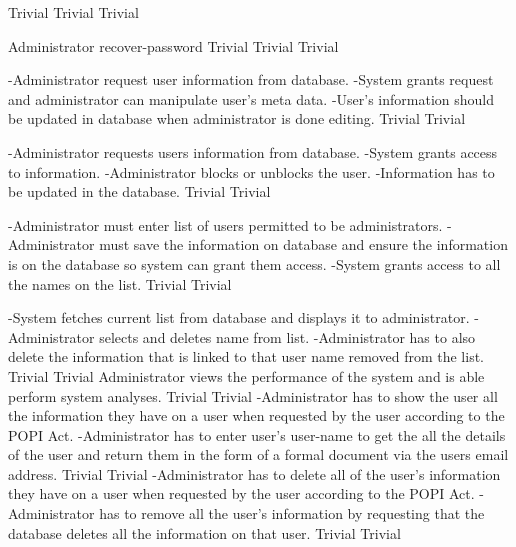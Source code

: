   	{Trivial}
	 	{Trivial}
  	{Trivial}
	  
\FuncReq
    {Administrator recover-password}		
		{Trivial}
  	{Trivial}
		{Trivial}
 
		{-Administrator request user information from database.
		-System grants request and administrator can manipulate user's meta data.
		-User's information should be updated in database when administrator is done editing.}
		{Trivial}
       		{Trivial}
       
		{-Administrator requests users information from database.
		-System grants access to information.
		-Administrator blocks or unblocks the user.
		-Information has to be updated in the database.}
		{Trivial}
        	{Trivial}
		
		
		{-Administrator must enter list of users permitted to be administrators.
		-Administrator must save the information on database and ensure the information     		     			 		  is on the database so system can grant them access.
		-System grants access to all the names on the list.}
		{Trivial}
        	{Trivial}
		
		{-System fetches current list from database and displays it to administrator.
		-Administrator selects and deletes name from list.
		-Administrator has to also delete the information that is linked to that user 					 			 name removed from the list.}
		{Trivial}
       	 	{Trivial}
        {Administrator views the performance of the system and is able perform system analyses.}
        {Trivial}
        {Trivial}
	{-Administrator has to show the user all the information they have on a user when requested by the user according to the POPI 		 Act.
	-Administrator has to enter user's user-name to get the all the details of the user and return them in the form of a formal 		  document via the users email address.}
	{Trivial}
	{Trivial}
	{-Administrator has to delete all of the user's information they have on a user when requested by the user according to the POPI 	  Act.
	-Administrator has to remove all the user's information by requesting that the database deletes all the information on that 		 user.}
	{Trivial}
	{Trivial}

